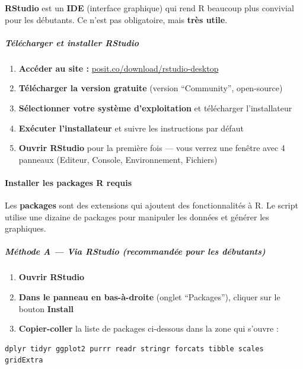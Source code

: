 \textbf{RStudio} est un \textbf{IDE} (interface graphique) qui rend R
beaucoup plus convivial pour les débutants. Ce n'est pas obligatoire,
mais \textbf{très utile}.

\subparagraph{Télécharger et installer
RStudio}\label{tuxe9luxe9charger-et-installer-rstudio}

\begin{enumerate}
\def\labelenumi{\arabic{enumi}.}
\tightlist
\item
  \textbf{Accéder au site :}
  \href{https://posit.co/download/rstudio-desktop/}{posit.co/download/rstudio-desktop}
\item
  \textbf{Télécharger la version gratuite} (version ``Community'',
  open-source)
\item
  \textbf{Sélectionner votre système d'exploitation} et télécharger
  l'installateur
\item
  \textbf{Exécuter l'installateur} et suivre les instructions par défaut
\item
  \textbf{Ouvrir RStudio} pour la première fois --- vous verrez une
  fenêtre avec 4 panneaux (Editeur, Console, Environnement, Fichiers)
\end{enumerate}

\paragraph{Installer les packages R
requis}\label{installer-les-packages-r-requis}

Les \textbf{packages} sont des extensions qui ajoutent des
fonctionnalités à R. Le script utilise une dizaine de packages pour
manipuler les données et générer les graphiques.

\subparagraph{Méthode A --- Via RStudio (recommandée pour les
débutants)}\label{muxe9thode-a-via-rstudio-recommanduxe9e-pour-les-duxe9butants}

\begin{enumerate}
\def\labelenumi{\arabic{enumi}.}
\tightlist
\item
  \textbf{Ouvrir RStudio}
\item
  \textbf{Dans le panneau en bas-à-droite} (onglet ``Packages''),
  cliquer sur le bouton \textbf{Install}
\item
  \textbf{Copier-coller} la liste de packages ci-dessous dans la zone
  qui s'ouvre :
\end{enumerate}

\begin{verbatim}
dplyr tidyr ggplot2 purrr readr stringr forcats tibble scales gridExtra
\end{verbatim}

